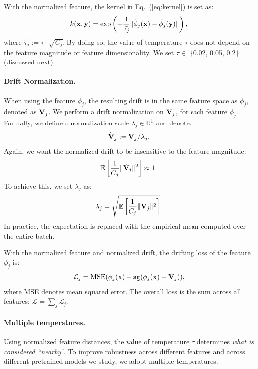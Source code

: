 With the normalized feature, the kernel in Eq.~(\ref{eq:kernel}) is set as:
\begin{equation}
k(\mathbf{x}, \mathbf{y}) = \exp\left(-\frac{1}{\tilde{\tau_j}} \|\tilde{\phi}_j(\mathbf{x}) - \tilde{\phi}_j(\mathbf{y})\|\right),
\end{equation}
where $\tilde{\tau_j}:=\tau{\cdot}\sqrt{C_j}$. By doing so, the value of temperature $\tau$ does not depend on the feature magnitude or feature dimensionality. We set $\tau \in$ \{0.02, 0.05, 0.2\} (discussed next).

\paragraph{Drift Normalization.} When using the feature $\phi_j$, the resulting drift is in the same feature space as $\phi_j$, denoted as $\mathbf{V}_j$. We perform a drift normalization on $\mathbf{V}_j$, for each feature $\phi_j$. Formally, we define a normalization scale $\lambda_j \in \mathbb{R}^1$ and denote:
\begin{equation}
\tilde{\mathbf{V}}_j:=\mathbf{V}_j / \lambda_j.
\end{equation}
Again, we want the normalized drift to be insensitive to the feature magnitude:
\begin{equation}
\mathbb{E} \left[ \frac{1}{C_j}\| \tilde{\mathbf{V}}_j \|^2 \right] \approx 1.
\end{equation}
To achieve this, we set $\lambda_j$ as:
\begin{equation}
\label{eq:lambda}
\lambda_j = \sqrt{\mathbb{E} \left[ \frac{1}{C_j} \| \mathbf{V}_j \|^2 \right]}.
\end{equation}
In practice, the expectation is replaced with the empirical mean computed over the entire batch.

With the normalized feature and normalized drift, the drifting loss of the feature $\phi_j$ is:
\begin{equation}
\label{eq:mse_loss_j}
\mathcal{L}_j = \text{MSE}(\tilde\phi_j({\mathbf{x}}) -  \texttt{sg}(\tilde\phi_j({\mathbf{x}}) + \tilde{\mathbf{V}}_j)),
\end{equation}
where MSE denotes mean squared error.
The overall loss is the sum across all features:
$\mathcal{L} = \sum_j {\mathcal{L}_j}$.

\paragraph{Multiple temperatures.}
Using normalized feature distances, the value of temperature $\tau$ determines \textit{what is considered ``nearby''}.
To improve robustness across different features and across different pretrained models we study, we adopt multiple temperatures.

